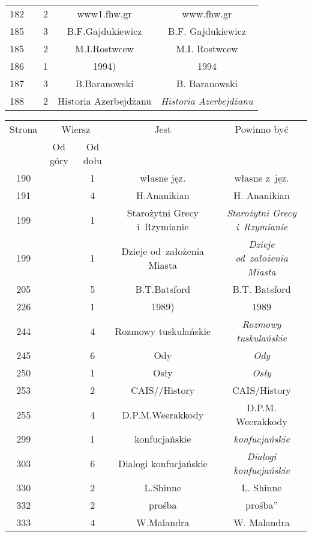 \documentclass[a4paper,11pt]{article}
\begin{document}
\begin{center}
\begin{tabular}{|c|c|c|c|c|}
    182 & &  2 & www1.fhw.gr & www.fhw.gr \\
    185 & &  3 & B.F.Gajdukiewicz & B.F. Gajdukiewicz \\
    185 & &  2 & M.I.Rostwcew & M.I. Rostwcew \\
    186 & &  1 & 1994) & 1994 \\
    187 & &  3 & B.Baranowski & B. Baranowski \\
    188 & &  2 & Historia Azerbejdżanu & \textit{Historia Azerbejdżanu} \\
    \hline
  \end{tabular}





  \newpage

  \begin{tabular}{|c|c|c|c|c|}
    \hline
    Strona & \multicolumn{2}{c|}{Wiersz} & Jest
                              & Powinno być \\ \cline{2-3}
    & Od góry & Od dołu & & \\
    \hline
    190 & &  1 & własne jęz. & własne z~jęz. \\
    191 & &  4 & H.Ananikian & H. Ananikian \\
    199 & &  1 & Starożytni Grecy i~Rzymianie
           & \textit{Starożytni Grecy i~Rzymianie} \\
    199 & &  1 & Dzieje od~założenia Miasta
           & \textit{Dzieje od~założenia Miasta} \\
    205 & &  5 & B.T.Batsford & B.T. Batsford \\
    226 & &  1 & 1989) & 1989 \\
    244 & &  4 & Rozmowy tuskulańskie
           & \textit{Rozmowy tuskulańskie} \\
    245 & &  6 & Ody & \textit{Ody} \\
    250 & &  1 & Osły & \textit{Osły} \\
    253 & &  2 & CAIS//History & CAIS/History \\
    255 & &  4 & D.P.M.Weerakkody & D.P.M. Weerakkody \\
    299 & &  1 & konfucjańskie & \textit{konfucjańskie} \\
    303 & &  6 & Dialogi konfucjańskie & \textit{Dialogi konfucjańskie} \\
    330 & &  2 & L.Shinne & L. Shinne \\
    332 & &  2 & prośba & prośba'' \\
    333 & &  4 & W.Malandra & W. Malandra \\

\end{tabular}
\end{center}
\end{document}
